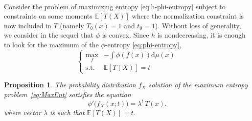 \documentclass[english,onecolumn]{elsarticle}
\def\dmu{\mathrm{d}\mu}
\def\Esp{\mathbb{E}}
\newtheorem{proposition}{Proposition}
\begin{document}
\

Consider the  problem of maximizing entropy  \eqref{eq:h-phi-entropy} subject to
constraints  on  some moments  $\Esp\left[T(X)\right]$  where the  normalization
constraint is now included  in $T$ (namely $T_0(x) = 1$ and  $t_0 = 1$). Without
loss of generality,  we consider in the sequel that $\phi$  is convex. Since $h$
is nondecreasing,  it is enough  to look for  the maximum of  the $\phi$-entropy
\eqref{eq:phi-entropy},
%
\begin{equation}
\begin{cases}
\max_f & \displaystyle -\int \phi(f(x))\dmu(x)\\[2mm]
%
\text{s.t. } & \Esp\left[T(X)\right] = t%
%
\end{cases}
\label{eq:MaxEnt}
\end{equation}
%
\begin{proposition}
  The   probability  distribution   $f_X$  solution   of  the   maximum  entropy
  problem~\eqref{eq:MaxEnt} satisfies the equation
%
\begin{equation}
\phi' \big( f_X(x;t) \big) = \lambda^t \, T(x).
\label{eq:sol-h-phi}
\end{equation}
%
where vector $\lambda$ is such that $\Esp[T(X)] = t$.
\end{proposition}
%
\end{document}
